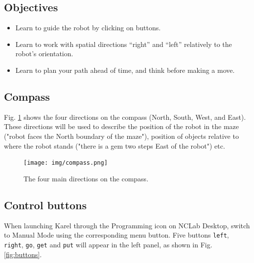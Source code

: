\subsection{Objectives} 
\begin{itemize}
\item Learn to guide the robot by clicking on buttons.
\item Learn to work with spatial directions ``right'' and ``left'' relatively to the robot's orientation. 
\item Learn to plan your path ahead of time, and think before making a move.
\end{itemize}

\subsection{Compass}

Fig. \ref{fig:ori} shows the four directions on the compass
(North, South, West, and East). These directions will be used
to describe the position of the robot in the maze ("robot faces
the North boundary of the maze"), position of objects relative 
to where the robot stands ("there is a gem two steps East of 
the robot") etc.
\newpage

\begin{figure}[!ht]
\begin{center}
\texttt{[image: img/compass.png]}
\vspace{-0mm}
\caption{The four main directions on the compass.}
\label{fig:ori}
\end{center}
\vspace{-1cm}
\end{figure}

\subsection{Control buttons}

When launching Karel through the Programming icon on NCLab Desktop, 
switch to Manual Mode using the corresponding 
menu button. Five buttons {\tt left}, {\tt right}, {\tt go}, {\tt get} and {\tt put} will 
appear in the left panel, as shown in Fig. \ref{fig:buttons}.

